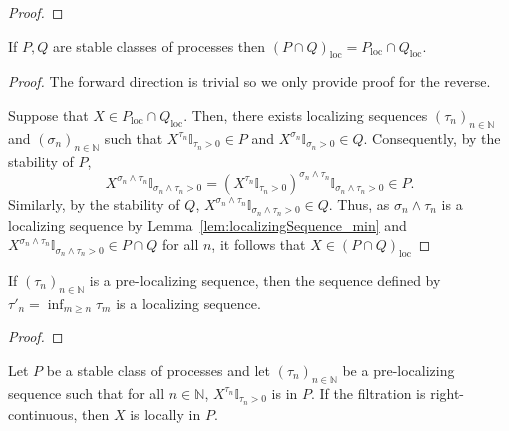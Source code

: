 \begin{proof}\leanok

\end{proof}


\begin{lemma}\label{lem:locally_inter}
  \leanok
If $P, Q$ are stable classes of processes then $(P\cap Q)_{\mathrm{loc}} = P_{\mathrm{loc}}\cap Q_{\mathrm{loc}}$.
\end{lemma}

\begin{proof}\leanok
The forward direction is trivial so we only provide proof for the reverse.

Suppose that $X \in P_{\mathrm{loc}}\cap Q_{\mathrm{loc}}$. Then, there exists localizing sequences $(\tau_n)_{n \in \mathbb{N}}$ and $(\sigma_n)_{n \in \mathbb{N}}$ such that $X^{\tau_n} \mathbb{I}_{\tau_n > 0}\in P$ and $X^{\sigma_n} \mathbb{I}_{\sigma_n > 0} \in Q$. Consequently, by the stability of $P$,
\[X^{\sigma_n \wedge \tau_n} \mathbb{I}_{\sigma_n \wedge \tau_n > 0} = (X^{\tau_n} \mathbb{I}_{\tau_n > 0})^{\sigma_n \wedge \tau_n} \mathbb{I}_{\sigma_n \wedge \tau_n > 0} \in P.\]
Similarly, by the stability of $Q$, $X^{\sigma_n \wedge \tau_n} \mathbb{I}_{\sigma_n \wedge \tau_n > 0} \in Q$. Thus, as $\sigma_n \wedge \tau_n$ is a localizing sequence by Lemma~\ref{lem:localizingSequence_min} and $X^{\sigma_n \wedge \tau_n} \mathbb{I}_{\sigma_n \wedge \tau_n > 0} \in P \cap Q$ for all $n$, it follows that $X \in (P \cap Q)_{\mathrm{loc}}$
\end{proof}

\begin{lemma}\label{lem:isLocalizingSequence_of_isPreLocalizingSequence}
  \leanok
If $(\tau_n)_{n \in \mathbb{N}}$ is a pre-localizing sequence, then the sequence defined by $\tau'_n = \inf_{m \ge n} \tau_m$ is a localizing sequence.
\end{lemma}

\begin{proof}\leanok

\end{proof}


\begin{lemma}\label{lem:locally_of_isPreLocalizingSequence}
  \leanok
Let $P$ be a stable class of processes and let $(\tau_n)_{n \in \mathbb{N}}$ be a pre-localizing sequence such that for all $n \in \mathbb{N}$, $X^{\tau_n}\mathbb{I}_{\tau_n > 0}$ is in $P$.
If the filtration is right-continuous, then $X$ is locally in $P$.
\end{lemma}


